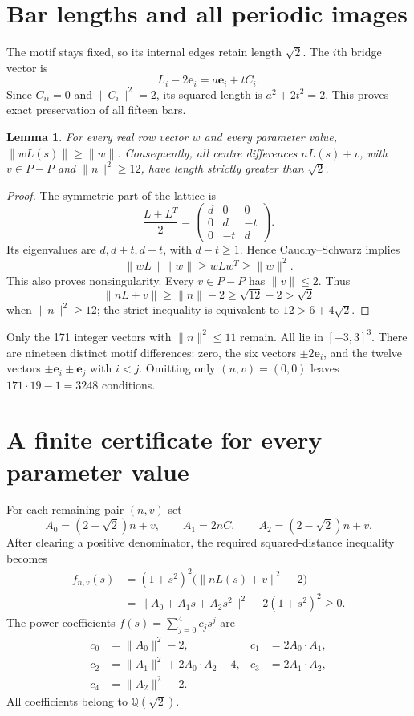 \documentclass[11pt]{amsart}
\newtheorem{lemma}{Lemma}
\theoremstyle{remark}
\newcommand{\Q}{\mathbb Q}
\newcommand{\e}{\mathbf e}
\newcommand{\norm}[1]{\lVert#1\rVert}
\begin{document}
\section{Bar lengths and all periodic images}

The motif stays fixed, so its internal edges retain length $\sqrt2$. The $i$th bridge vector is
\[
 L_i-2\e_i=a\e_i+tC_i.
\]
Since $C_{ii}=0$ and $\norm{C_i}^2=2$, its squared length is $a^2+2t^2=2$. This proves exact preservation of all fifteen bars.

\begin{lemma}\label{lem:tail}
For every real row vector $w$ and every parameter value, $\norm{wL(s)}\ge\norm w$. Consequently, all centre differences $nL(s)+v$, with $v\in P-P$ and $\norm n^2\ge12$, have length strictly greater than $\sqrt2$.
\end{lemma}
\begin{proof}
The symmetric part of the lattice is
\[
 \frac{L+L^T}{2}=\begin{pmatrix}d&0&0\\0&d&-t\\0&-t&d\end{pmatrix}.
\]
Its eigenvalues are $d,d+t,d-t$, with $d-t\ge1$. Hence Cauchy--Schwarz implies
\[
 \norm{wL}\norm w\ge wLw^T\ge\norm w^2.
\]
This also proves nonsingularity. Every $v\in P-P$ has $\norm v\le2$. Thus
\[
 \norm{nL+v}\ge\norm n-2\ge\sqrt{12}-2>\sqrt2
\]
when $\norm n^2\ge12$; the strict inequality is equivalent to $12>6+4\sqrt2$.
\end{proof}

Only the 171 integer vectors with $\norm n^2\le11$ remain. All lie in $[-3,3]^3$. There are nineteen distinct motif differences: zero, the six vectors $\pm2\e_i$, and the twelve vectors $\pm\e_i\pm\e_j$ with $i<j$. Omitting only $(n,v)=(0,0)$ leaves $171\cdot19-1=3248$ conditions.

\section{A finite certificate for every parameter value}

For each remaining pair $(n,v)$ set
\[
 A_0=(2+\sqrt2)n+v,\qquad A_1=2nC,\qquad A_2=(2-\sqrt2)n+v.
\]
After clearing a positive denominator, the required squared-distance inequality becomes
\begin{align}
 f_{n,v}(s)&=(1+s^2)^2\bigl(\norm{nL(s)+v}^2-2\bigr)\label{eq:quartic}\\
 &=\norm{A_0+A_1s+A_2s^2}^2-2(1+s^2)^2\ge0.\nonumber
\end{align}
The power coefficients $f(s)=\sum_{j=0}^4c_js^j$ are
\begin{align*}
 c_0&=\norm{A_0}^2-2,&c_1&=2A_0\cdot A_1,\\
 c_2&=\norm{A_1}^2+2A_0\cdot A_2-4,&c_3&=2A_1\cdot A_2,\\
 c_4&=\norm{A_2}^2-2.
\end{align*}
All coefficients belong to $\Q(\sqrt2)$.
\end{document}
